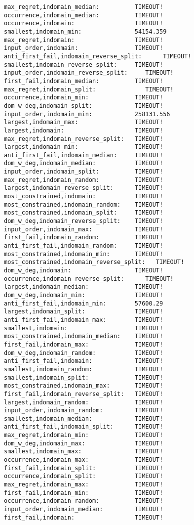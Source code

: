\documentclass[11pt]{article}
\begin{document}
\begin{verbatim}
max_regret,indomain_median:          TIMEOUT!
occurrence,indomain_median:          TIMEOUT!
occurrence,indomain:                 TIMEOUT!
smallest,indomain_min:               54154.359
max_regret,indomain:                 TIMEOUT!
input_order,indomain:                TIMEOUT!
anti_first_fail,indomain_reverse_split:      TIMEOUT!
smallest,indomain_reverse_split:     TIMEOUT!
input_order,indomain_reverse_split:     TIMEOUT!
first_fail,indomain_median:          TIMEOUT!
max_regret,indomain_split:              TIMEOUT!
occurrence,indomain_min:             TIMEOUT!
dom_w_deg,indomain_split:            TIMEOUT!
input_order,indomain_min:            258131.556
largest,indomain_max:                TIMEOUT!
largest,indomain:                    TIMEOUT!
max_regret,indomain_reverse_split:   TIMEOUT!
largest,indomain_min:                TIMEOUT!
anti_first_fail,indomain_median:     TIMEOUT!
dom_w_deg,indomain_median:           TIMEOUT!
input_order,indomain_split:          TIMEOUT!
max_regret,indomain_random:          TIMEOUT!
largest,indomain_reverse_split:      TIMEOUT!
most_constrained,indomain:           TIMEOUT!
most_constrained,indomain_random:    TIMEOUT!
most_constrained,indomain_split:     TIMEOUT!
dom_w_deg,indomain_reverse_split:    TIMEOUT!
input_order,indomain_max:            TIMEOUT!
first_fail,indomain_random:          TIMEOUT!
anti_first_fail,indomain_random:     TIMEOUT!
most_constrained,indomain_min:       TIMEOUT!
most_constrained,indomain_reverse_split:   TIMEOUT!
dom_w_deg,indomain:                  TIMEOUT!
occurrence,indomain_reverse_split:      TIMEOUT!
largest,indomain_median:             TIMEOUT!
dom_w_deg,indomain_min:              TIMEOUT!
anti_first_fail,indomain_min:        57600.29
largest,indomain_split:              TIMEOUT!
anti_first_fail,indomain_max:        TIMEOUT!
smallest,indomain:                   TIMEOUT!
most_constrained,indomain_median:    TIMEOUT!
first_fail,indomain_max:             TIMEOUT!
dom_w_deg,indomain_random:           TIMEOUT!
anti_first_fail,indomain:            TIMEOUT!
smallest,indomain_random:            TIMEOUT!
smallest,indomain_split:             TIMEOUT!
most_constrained,indomain_max:       TIMEOUT!
first_fail,indomain_reverse_split:   TIMEOUT!
largest,indomain_random:             TIMEOUT!
input_order,indomain_random:         TIMEOUT!
smallest,indomain_median:            TIMEOUT!
anti_first_fail,indomain_split:      TIMEOUT!
max_regret,indomain_min:             TIMEOUT!
dom_w_deg,indomain_max:              TIMEOUT!
smallest,indomain_max:               TIMEOUT!
occurrence,indomain_max:             TIMEOUT!
first_fail,indomain_split:           TIMEOUT!
occurrence,indomain_split:           TIMEOUT!
max_regret,indomain_max:             TIMEOUT!
first_fail,indomain_min:             TIMEOUT!
occurrence,indomain_random:          TIMEOUT!
input_order,indomain_median:         TIMEOUT!
first_fail,indomain:                 TIMEOUT!
\end{verbatim}   
\end{document}
